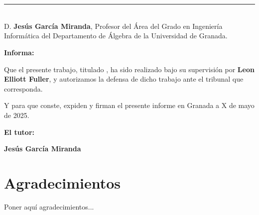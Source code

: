 \chapter*{}
\thispagestyle{empty}

\noindent\rule[-1ex]{\textwidth}{2pt}\\[4.5ex]

D. \textbf{Jesús García Miranda}, Profesor del Área del Grado en Ingeniería Informática  del Departamento de Álgebra de la Universidad de Granada.

\vspace{0.5cm}

\vspace{0.5cm}

\textbf{Informa:}

\vspace{0.5cm}

Que el presente trabajo, titulado \textit{\textbf{\myTitle}},
ha sido realizado bajo su supervisión por \textbf{Leon Elliott Fuller}, y autorizamos la defensa de dicho trabajo ante el tribunal
que corresponda.

\vspace{0.5cm}

Y para que conste, expiden y firman el presente informe en Granada a X de mayo de 2025.

\vspace{1cm}

\textbf{El tutor:}

\vspace{5cm}

\noindent \textbf{Jesús García Miranda}

\chapter*{Agradecimientos}
\thispagestyle{empty}

       \vspace{1cm}


Poner aquí agradecimientos...

